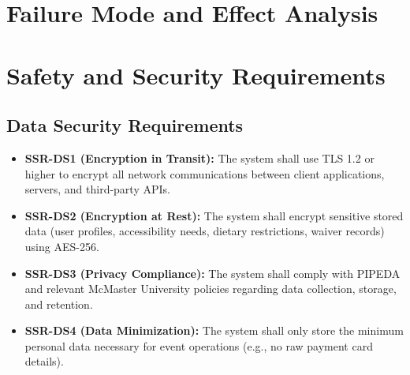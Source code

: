 \documentclass{article}
\begin{document}
\section{Failure Mode and Effect Analysis}


\section{Safety and Security Requirements}

\subsection{Data Security Requirements}
\begin{itemize}
    \item \textbf{SSR-DS1 (Encryption in Transit):} The system shall use TLS 1.2 or higher to encrypt all network communications between client applications, servers, and third-party APIs.
    \item \textbf{SSR-DS2 (Encryption at Rest):} The system shall encrypt sensitive stored data (user profiles, accessibility needs, dietary restrictions, waiver records) using AES-256.
    \item \textbf{SSR-DS3 (Privacy Compliance):} The system shall comply with PIPEDA and relevant McMaster University policies regarding data collection, storage, and retention.
    \item \textbf{SSR-DS4 (Data Minimization):} The system shall only store the minimum personal data necessary for event operations (e.g., no raw payment card details).
\end{itemize}
\end{document}
